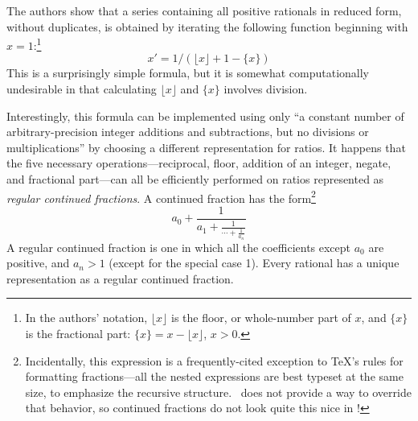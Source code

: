 The authors show that a series containing all positive rationals in reduced form, without duplicates, is obtained by iterating the following function beginning with $x=1$:\footnote{In the authors' notation, $\lfloor x \rfloor$ is the floor, or whole-number part of $x$, and $\{x\}$ is the fractional part: $\{x\} = x - \lfloor x \rfloor$, $x > 0$.}
$$x' = 1/{(\lfloor x \rfloor + 1 - \{x\})}$$ This is a surprisingly simple formula, but it is somewhat computationally undesirable in that calculating $\lfloor x \rfloor$ and $\{x\}$ involves division.

Interestingly, this formula can be implemented using only ``a constant number of arbitrary-precision integer additions and subtractions, but no divisions or multiplications'' by choosing a different representation for ratios. It happens that the five necessary operations---reciprocal, floor, addition of an integer, negate, and fractional part---can all be efficiently performed on ratios represented as \emph{regular continued fractions}. A continued fraction has the form\footnote{Incidentally, this expression is a frequently-cited exception to \TeX's rules for formatting fractions---all the nested expressions are best typeset at the same size, to emphasize the recursive structure. \Meta\ does not provide a way to override that behavior, so continued fractions do not look quite this nice in \Meta!}
$$a_0 + \frac{1}{
    \displaystyle a_1 + \frac{\displaystyle 1}{
        \displaystyle \cdots + \frac{\displaystyle 1}{
            \displaystyle a_n}}}$$
A regular continued fraction is one in which all the coefficients except $a_0$ are positive, and $a_n > 1$ (except for the special case 1). Every rational has a unique representation as a regular continued fraction.

